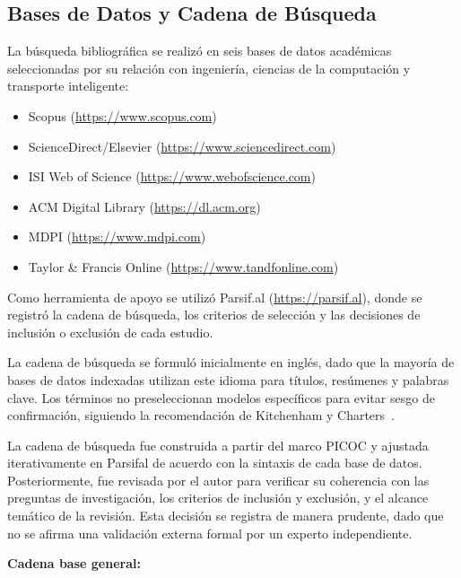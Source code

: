 \documentclass[12pt, a4paper]{article}
\begin{document}
\subsection{Bases de Datos y Cadena de B\'{u}squeda}

La b\'{u}squeda bibliogr\'{a}fica se realiz\'{o} en seis bases de datos acad\'{e}micas seleccionadas por su relaci\'{o}n con ingenier\'{i}a, ciencias de la computaci\'{o}n y transporte inteligente:

\begin{itemize}
  \item Scopus (\url{https://www.scopus.com})
  \item ScienceDirect/Elsevier (\url{https://www.sciencedirect.com})
  \item ISI Web of Science (\url{https://www.webofscience.com})
  \item ACM Digital Library (\url{https://dl.acm.org})
  \item MDPI (\url{https://www.mdpi.com})
  \item Taylor \& Francis Online (\url{https://www.tandfonline.com})
\end{itemize}

Como herramienta de apoyo se utiliz\'{o} Parsif.al (\url{https://parsif.al}), donde se registr\'{o} la cadena de b\'{u}squeda, los criterios de selecci\'{o}n y las decisiones de inclusi\'{o}n o exclusi\'{o}n de cada estudio.

\begin{notamet}
La cadena de b\'{u}squeda se formul\'{o} inicialmente en ingl\'{e}s, dado que la mayor\'{i}a de bases de datos indexadas utilizan este idioma para t\'{i}tulos, res\'{u}menes y palabras clave. Los t\'{e}rminos no preseleccionan modelos espec\'{i}ficos para evitar sesgo de confirmaci\'{o}n, siguiendo la recomendaci\'{o}n de Kitchenham y Charters~\cite{Kitchenham2007}.
\end{notamet}

La cadena de b\'{u}squeda fue construida a partir del marco PICOC y ajustada iterativamente en Parsifal de acuerdo con la sintaxis de cada base de datos. Posteriormente, fue revisada por el autor para verificar su coherencia con las preguntas de investigaci\'{o}n, los criterios de inclusi\'{o}n y exclusi\'{o}n, y el alcance tem\'{a}tico de la revisi\'{o}n. Esta decisi\'{o}n se registra de manera prudente, dado que no se afirma una validaci\'{o}n externa formal por un experto independiente.

\noindent\textbf{Cadena base general:}
\begin{center}
\end{center}
\end{document}
